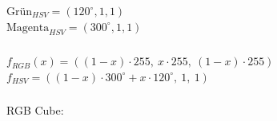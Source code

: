 \documentclass[a4paper,10pt,DIV=14]{article}
\begin{document}
$
\text{Grün}_{HSV} = (120^\circ, 1, 1)
$\\
$
\text{Magenta}_{HSV} = (300^\circ, 1, 1)
$

\subsubsection{}

$
f_{RGB}(x) = ((1-x)\cdot255, \ x\cdot255, \ (1-x)\cdot255)
$\\
$
f_{HSV} = ((1-x)\cdot300^\circ + x\cdot 120^\circ, \ 1, \ 1)
$

\subsubsection{}

RGB Cube:\\

\end{document}
